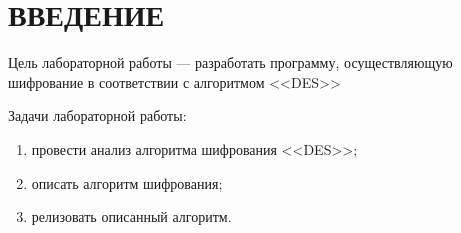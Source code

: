 \chapter*{ВВЕДЕНИЕ}

Цель лабораторной работы --- разработать программу, осуществляющую шифрование в соответствии с алгоритмом <<DES>>

Задачи лабораторной работы:

\begin{enumerate}
    \item провести анализ алгоритма шифрования <<DES>>;
    \item описать алгоритм шифрования;
    \item релизовать описанный алгоритм.
\end{enumerate}
